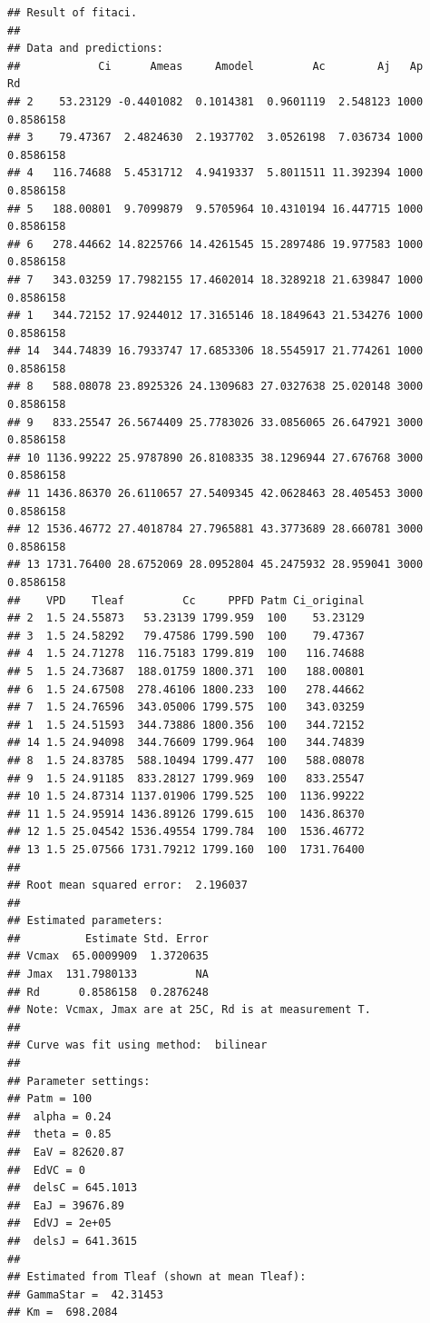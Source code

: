 \documentclass[]{krantz}
\theoremstyle{definition}
\theoremstyle{definition}
\theoremstyle{definition}
\theoremstyle{remark}
\begin{document}
\begin{verbatim}
## Result of fitaci.
## 
## Data and predictions:
##            Ci      Ameas     Amodel         Ac        Aj   Ap        Rd
## 2    53.23129 -0.4401082  0.1014381  0.9601119  2.548123 1000 0.8586158
## 3    79.47367  2.4824630  2.1937702  3.0526198  7.036734 1000 0.8586158
## 4   116.74688  5.4531712  4.9419337  5.8011511 11.392394 1000 0.8586158
## 5   188.00801  9.7099879  9.5705964 10.4310194 16.447715 1000 0.8586158
## 6   278.44662 14.8225766 14.4261545 15.2897486 19.977583 1000 0.8586158
## 7   343.03259 17.7982155 17.4602014 18.3289218 21.639847 1000 0.8586158
## 1   344.72152 17.9244012 17.3165146 18.1849643 21.534276 1000 0.8586158
## 14  344.74839 16.7933747 17.6853306 18.5545917 21.774261 1000 0.8586158
## 8   588.08078 23.8925326 24.1309683 27.0327638 25.020148 3000 0.8586158
## 9   833.25547 26.5674409 25.7783026 33.0856065 26.647921 3000 0.8586158
## 10 1136.99222 25.9787890 26.8108335 38.1296944 27.676768 3000 0.8586158
## 11 1436.86370 26.6110657 27.5409345 42.0628463 28.405453 3000 0.8586158
## 12 1536.46772 27.4018784 27.7965881 43.3773689 28.660781 3000 0.8586158
## 13 1731.76400 28.6752069 28.0952804 45.2475932 28.959041 3000 0.8586158
##    VPD    Tleaf         Cc     PPFD Patm Ci_original
## 2  1.5 24.55873   53.23139 1799.959  100    53.23129
## 3  1.5 24.58292   79.47586 1799.590  100    79.47367
## 4  1.5 24.71278  116.75183 1799.819  100   116.74688
## 5  1.5 24.73687  188.01759 1800.371  100   188.00801
## 6  1.5 24.67508  278.46106 1800.233  100   278.44662
## 7  1.5 24.76596  343.05006 1799.575  100   343.03259
## 1  1.5 24.51593  344.73886 1800.356  100   344.72152
## 14 1.5 24.94098  344.76609 1799.964  100   344.74839
## 8  1.5 24.83785  588.10494 1799.477  100   588.08078
## 9  1.5 24.91185  833.28127 1799.969  100   833.25547
## 10 1.5 24.87314 1137.01906 1799.525  100  1136.99222
## 11 1.5 24.95914 1436.89126 1799.615  100  1436.86370
## 12 1.5 25.04542 1536.49554 1799.784  100  1536.46772
## 13 1.5 25.07566 1731.79212 1799.160  100  1731.76400
## 
## Root mean squared error:  2.196037 
## 
## Estimated parameters:
##          Estimate Std. Error
## Vcmax  65.0009909  1.3720635
## Jmax  131.7980133         NA
## Rd      0.8586158  0.2876248
## Note: Vcmax, Jmax are at 25C, Rd is at measurement T.
## 
## Curve was fit using method:  bilinear 
## 
## Parameter settings:
## Patm = 100
##  alpha = 0.24
##  theta = 0.85
##  EaV = 82620.87
##  EdVC = 0
##  delsC = 645.1013
##  EaJ = 39676.89
##  EdVJ = 2e+05
##  delsJ = 641.3615
## 
## Estimated from Tleaf (shown at mean Tleaf):
## GammaStar =  42.31453 
## Km =  698.2084
\end{verbatim}
\end{document}
